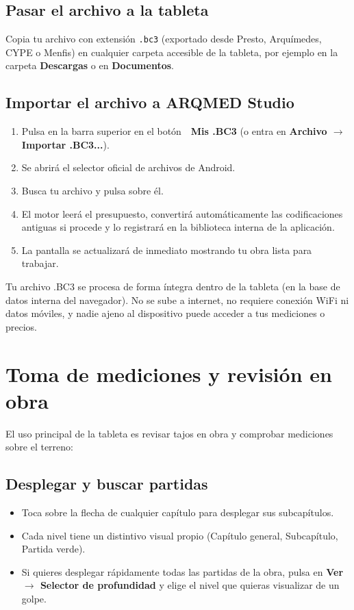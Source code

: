 \documentclass[11pt,a4paper]{article}
\begin{document}
\subsection{Pasar el archivo a la tableta}
Copia tu archivo con extensión \texttt{.bc3} (exportado desde Presto, Arquímedes, CYPE o Menfis) en cualquier carpeta accesible de la tableta, por ejemplo en la carpeta \textbf{Descargas} o en \textbf{Documentos}.

\subsection{Importar el archivo a ARQMED Studio}
\begin{enumerate}[leftmargin=*]
    \item Pulsa en la barra superior en el botón \textbf{📁 Mis .BC3} (o entra en \textbf{Archivo $\rightarrow$ Importar .BC3...}).
    \item Se abrirá el selector oficial de archivos de Android.
    \item Busca tu archivo y pulsa sobre él.
    \item El motor leerá el presupuesto, convertirá automáticamente las codificaciones antiguas si procede y lo registrará en la biblioteca interna de la aplicación.
    \item La pantalla se actualizará de inmediato mostrando tu obra lista para trabajar.
\end{enumerate}

\begin{aviso}
Tu archivo .BC3 se procesa de forma íntegra dentro de la tableta (en la base de datos interna del navegador). No se sube a internet, no requiere conexión WiFi ni datos móviles, y nadie ajeno al dispositivo puede acceder a tus mediciones o precios.
\end{aviso}

\section{Toma de mediciones y revisión en obra}

El uso principal de la tableta es revisar tajos en obra y comprobar mediciones sobre el terreno:

\subsection{Desplegar y buscar partidas}
\begin{itemize}[leftmargin=*]
    \item Toca sobre la flecha de cualquier capítulo para desplegar sus subcapítulos.
    \item Cada nivel tiene un distintivo visual propio (Capítulo general, Subcapítulo, Partida verde).
    \item Si quieres desplegar rápidamente todas las partidas de la obra, pulsa en \textbf{Ver $\rightarrow$ Selector de profundidad} y elige el nivel que quieras visualizar de un golpe.
\end{itemize}
\end{document}
